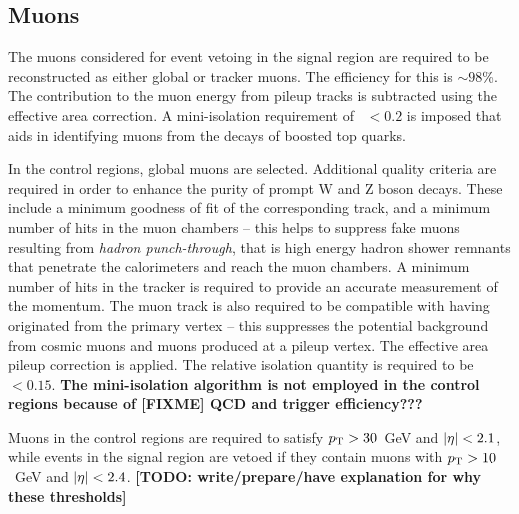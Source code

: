 \subsection*{Muons}

The muons considered for event vetoing in the signal region are required to be 
reconstructed as either global or tracker muons. The efficiency for this is 
$\sim98$\%. The contribution to the muon energy from pileup tracks is 
subtracted using the effective area correction. A mini-isolation requirement of 
\miniiso~$ < 0.2$ is imposed that aids in identifying muons from the decays of 
boosted top quarks.

In the control regions, global muons are selected. Additional quality criteria 
are required in order to enhance the purity of prompt W and Z boson decays. 
These include a minimum goodness of fit of the corresponding track, and a 
minimum number of hits in the muon chambers -- this helps to suppress fake 
muons resulting from \textit{hadron punch-through}, that is high energy hadron 
shower remnants that penetrate the calorimeters and reach the muon chambers. A 
minimum number of hits in the 
tracker is required to provide an accurate measurement of the momentum. The 
muon track is also required to be compatible with having originated from the 
primary vertex -- this suppresses the potential background from cosmic muons 
and muons produced at a pileup vertex. The effective area pileup correction is 
applied. The relative isolation quantity is required to be \reliso~$ < 0.15$. 
\textbf{The mini-isolation algorithm is not employed in the control regions 
\textbf{because of 
[FIXME]
QCD and trigger efficiency???}}



Muons in the control regions are required to satisfy ${p_{\text T}}>30$~GeV and 
$|\eta|<2.1$, while events in the signal region are vetoed if they contain 
muons with ${p_{\text T}}>10$~GeV and $|\eta|<2.4$. 
\textbf{[TODO: write/prepare/have explanation for why these thresholds]}

